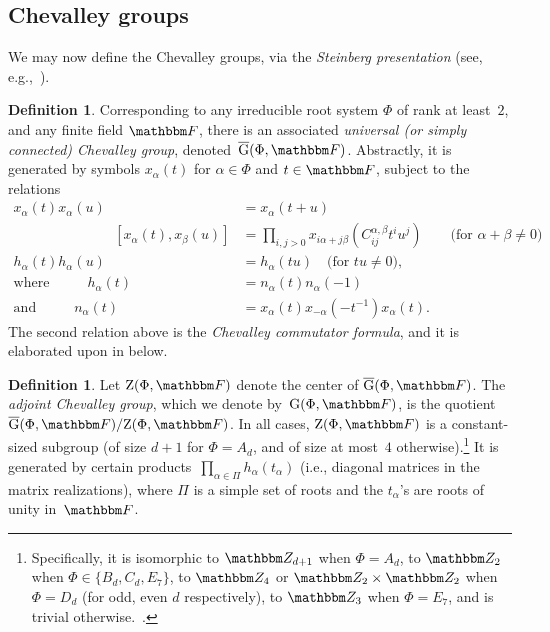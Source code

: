 \documentclass[10pt,a4paper]{article}
\theoremstyle{definition}
\newtheorem{definition}[theorem]{Definition}
\newcommand{\Z}{\mathbbm Z}
\newcommand{\F}{\mathbbm F}
\newcommand{\ol}[1]{\overline{#1}}
\newcommand{\Esc}[2]{\ol{\mathrm{G}}(#1,#2)}
\newcommand{\Gu}[2]{\ol{\mathrm{G}}(#1,#2)}
\newcommand{\G}[2]{\mathrm{G}(#1,#2)}
\newcommand{\Center}[2]{\mathrm{Z}(#1,#2)}
\begin{document}
\subsection{Chevalley groups}
We may now define the Chevalley groups, via the \emph{Steinberg presentation} (see, e.g.,~\cite[Thm.~12.1.1]{Car89}).
\begin{definition}  \label{def:chevgroup}
    Corresponding to any irreducible root system $\Phi$ of rank at least~$2$, and any finite field $\F$, there is an associated \emph{universal (or simply connected) Chevalley group}, denoted~$\Esc{\Phi}{\F}$. Abstractly, it is generated by symbols $x_\alpha(t)$ for $\alpha \in \Phi$ and $t \in \F$, subject to the relations
    \begin{align*}
    x_\alpha(t)x_\alpha(u) &= x_\alpha(t+u)\\
    \phantom{\qquad \text{if } \alpha+\beta \neq 0 } %
    [x_\alpha(t),x_\beta(u)] &= \prod_{i,j>0} x_{i\alpha+j\beta}(C_{ij}^{\alpha,\beta}t^iu^j) \qquad \text{(for $\alpha+\beta \neq 0$)}\\
    h_\alpha(t)h_\alpha(u) &= h_\alpha(tu) \quad \text{(for $tu \neq 0$)},\\
    \text{where }\hspace{1cm} h_\alpha(t) &= n_\alpha(t)n_\alpha(-1)\\
    \text{and }\hspace{1cm} n_\alpha(t) &= x_\alpha(t)x_{-\alpha}(-t^{-1})x_\alpha(t).
    \end{align*}
    The second relation above is the \emph{Chevalley commutator formula}, and it is elaborated upon in  below.
\end{definition}
\begin{definition}  \label{def:adj}
    Let $\Center{\Phi}{\F}$ denote the center of $\Gu{\Phi}{\F}$.
    The \emph{adjoint Chevalley group}, which we denote by~$\G{\Phi}{\F}$, is the quotient $\Esc{\Phi}{\F}/\Center{\Phi}{\F}$.
    In all cases, $\Center{\Phi}{\F}$ is a constant-sized subgroup (of size $d+1$ for $\Phi = A_d$, and of size at most~$4$ otherwise).\footnote{Specifically, it is isomorphic to $\Z_{d+1}$ when $\Phi = A_d$, to $\Z_2$ when $\Phi \in \{B_d, C_d, E_7\}$, to $\Z_4$ or $\Z_2 \times \Z_2$ when $\Phi = D_d$ (for odd, even $d$ respectively), to $\Z_3$ when $\Phi = E_7$, and is trivial otherwise.~\cite[Sec.~3.3]{Ste16}.}
    It is generated by certain products~$\prod_{\alpha \in \Pi} h_{\alpha}(t_\alpha)$ (i.e., diagonal matrices in the matrix realizations), where $\Pi$ is a simple set of roots and the $t_\alpha$'s are roots of unity in~$\F$.
\end{definition}
\end{document}
